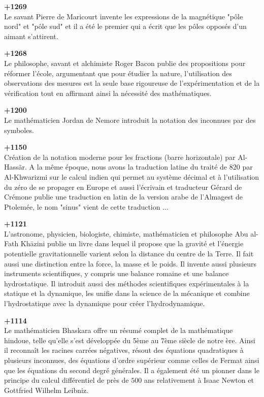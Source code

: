 \textbf{+1269}\\
Le savant Pierre de Maricourt invente les expressions de la magnétique "pôle nord" et "pôle sud" et il a été le premier qui a écrit que les pôles opposés d'un aimant s'attirent.

\textbf{+1268}\\
Le philosophe, savant et alchimiste Roger Bacon publie des propositions pour réformer l'école, argumentant que pour étudier la nature, l'utilisation des observations des mesures est la seule base rigoureuse de l'expérimentation et de la vérification tout en affirmant ainsi la nécessité des mathématiques.

\textbf{+1200}\\
Le mathématicien Jordan de Nemore introduit la notation des inconnues par des symboles.

\textbf{+1150}\\
Création de la notation moderne pour les fractions (barre horizontale) par Al-Hassãr. A la même époque, nous avons la traduction latine du traité de 820 par Al-Khwarizmi sur le calcul indien qui permet au système décimal et à l'utilisation du zéro de se propager en Europe et aussi l'écrivain et traducteur Gérard de Crémone publie une traduction en latin de la version arabe de l'Almagest de Ptolemée, le nom "sinus" vient de cette traduction ...

\textbf{+1121}\\
L'astronome, physicien, biologiste, chimiste, mathématicien et philosophe Abu al-Fath Khāzini publie un livre dans lequel il propose que la gravité et l'énergie potentielle gravitationnelle varient selon la distance du centre de la Terre. Il fait aussi une distinction entre la force, la masse et le poids. Il invente aussi plusieurs instruments scientifiques, y compris une balance romaine et une balance hydrostatique. Il introduit aussi des méthodes scientifiques expérimentales à la statique et la dynamique, les unifie dans la science de la mécanique et combine l'hydrostatique avec la dynamique pour créer l'hydrodynamique.

\textbf{+1114}\\
Le mathématicien Bhaskara offre un résumé complet de la mathématique hindoue, telle qu'elle s'est développée du 5ème au 7ème siècle de notre ère. Ainsi il  reconnaît les racines carrées négatives, résout des équations quadratiques à plusieurs inconnues, des équations d'ordre supérieur comme celles de Fermat ainsi que les équations du second degré générales. Il a également été un pionner dans le principe du calcul différentiel de près de $500$ ans relativement à Isaac Newton et Gottfried Wilhelm Leibniz.

